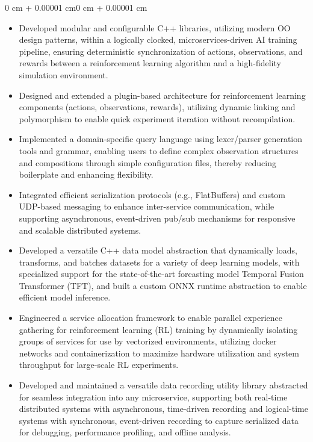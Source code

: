 \documentclass[11pt, letterpaper]{article}
\newenvironment{highlights}{
    \begin{itemize}[
        topsep=0.10 cm,
        parsep=0.10 cm,
        partopsep=0pt,
        itemsep=0pt,
        leftmargin=0.4 cm + 10pt
    ]
}{
    \end{itemize}
}
\newenvironment{onecolentry}{
    \begin{adjustwidth}{0 cm + 0.00001 cm}{0 cm + 0.00001 cm}
}{
    \end{adjustwidth}
}
\begin{document}
\vspace{0.10 cm}
\begin{onecolentry}
    \begin{highlights}
        \item Developed modular and configurable C++ libraries, utilizing modern OO design patterns, within a logically clocked, microservices-driven AI training pipeline, ensuring deterministic synchronization of actions, observations, and rewards between a reinforcement learning algorithm and a high-fidelity simulation environment.
        \item Designed and extended a plugin-based architecture for reinforcement learning components (actions, observations, rewards), utilizing dynamic linking and polymorphism to enable quick experiment iteration without recompilation.
        \item Implemented a domain-specific query language using lexer/parser generation tools and grammar, enabling users to define complex observation structures and compositions through simple configuration files, thereby reducing boilerplate and enhancing flexibility.
        \item Integrated efficient serialization protocols (e.g., FlatBuffers) and custom UDP-based messaging to enhance inter-service communication, while supporting asynchronous, event-driven pub/sub mechanisms for responsive and scalable distributed systems.
        \item Developed a versatile C++ data model abstraction that dynamically loads, transforms, and batches datasets for a variety of deep learning models, with specialized support for the state-of-the-art forcasting model Temporal Fusion Transformer (TFT), and built a custom ONNX runtime abstraction to enable efficient model inference.
        \item Engineered a service allocation framework to enable parallel experience gathering for reinforcement learning (RL) training by dynamically isolating groups of services for use by vectorized environments, utilizing docker networks and containerization to maximize hardware utilization and system throughput for large-scale RL experiments.
        \item Developed and maintained a versatile data recording utility library abstracted for seamless integration into any microservice, supporting both real-time distributed systems with asynchronous, time-driven recording and logical-time systems with synchronous, event-driven recording to capture serialized data for debugging, performance profiling, and offline analysis.

\end{highlights}
\end{onecolentry}
\end{document}

